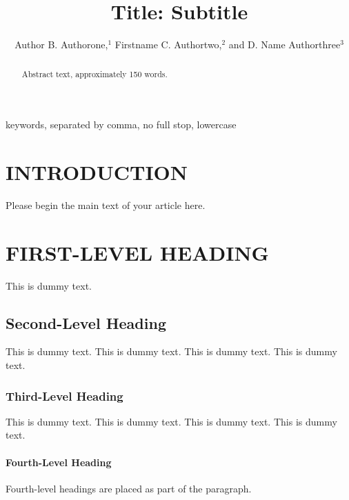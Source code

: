 \documentclass{style/ar-1col}
\begin{document}

\title{Title: Subtitle}


\author{Author B. Authorone,$^1$ Firstname C. Authortwo,$^2$ and D. Name Authorthree$^3$
}

\begin{abstract}
Abstract text, approximately 150 words. 
\end{abstract}

\begin{keywords}
keywords, separated by comma, no full stop, lowercase
\end{keywords}
\maketitle

\tableofcontents


\section{INTRODUCTION}
Please begin the main text of your article here. 



\section{FIRST-LEVEL HEADING}
This is dummy text. 
\subsection{Second-Level Heading}
This is dummy text. This is dummy text. This is dummy text. This is dummy text.

\subsubsection{Third-Level Heading}
This is dummy text. This is dummy text. This is dummy text. This is dummy text. 

\paragraph{Fourth-Level Heading} Fourth-level headings are placed as part of the paragraph.
\end{document}
